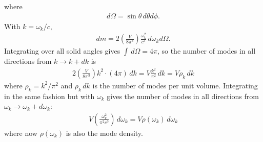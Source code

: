 \documentclass{book}
\theoremstyle{definition}
\newcommand{\f}[2]{\frac{#1}{#2}}
\newcommand{\lp}{\left(}
\newcommand{\rp}{\right)}
\begin{document}
where
\begin{align}
d\Omega = \sin\theta \,d\theta d\phi.
\end{align}
With $k = \omega_k/c$,
\begin{align}
dm = 2\lp \f{V}{8\pi^3} \rp \f{\omega^2_k}{c^3} \, d\omega_k d\Omega.
\end{align}
Integrating over all solid angles gives $\int \,d\Omega = 4\pi$, so the number of modes in all directions from $k \to k + dk$ is 
\begin{align}
2\lp \f{V}{8\pi^3} \rp k^2 \cdot (4\pi) \, dk = V \f{k^2}{\pi^2}\,dk = V \rho_k \,dk
\end{align}
where $\rho_k = k^2/\pi^2$ and $\rho_k \,dk$ is the number of modes per unit volume. Integrating in the same fashion but with $\omega_k$ gives the number of modes in all directions from $\omega_k \to \omega_k + d\omega_k$:
\begin{align}
V \lp \f{\omega_k^2}{\pi^2 c^3} \rp\,d\omega_k = V \rho(\omega_k)\,d\omega_k
\end{align}
where now $\rho(\omega_k)$ is also the mode density. \\
\end{document}
